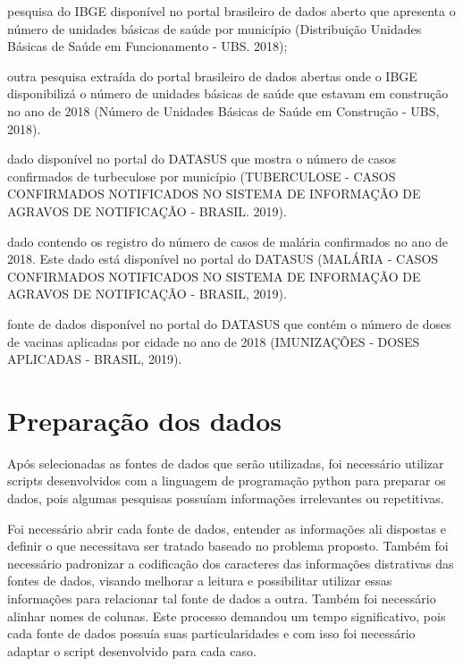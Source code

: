 \documentclass[
	12pt,				%
	openright,			%
	oneside,			%
	a4paper,			%
	chapter=TITLE,		%
	section=TITLE,		%
	subsection=TITLE,	%
	subsubsection=TITLE,%
	english,			%
	brazil				%
	]{abntex2}
\theoremstyle{definition}
\begin{document}
    \begin{description}[font=$\bullet$~\normalfont\scshape\color{black!50!black}]
    \item [UBS Existente] pesquisa do IBGE disponível no portal brasileiro de dados aberto que apresenta o número de unidades básicas de saúde por município (Distribuição Unidades Básicas de Saúde em Funcionamento - UBS. 2018);
    \item [UBS Construção] outra pesquisa extraída do portal brasileiro de dados abertas onde o IBGE disponibilizá o número de unidades básicas de saúde que estavam em construção no ano de 2018 (Número de Unidades Básicas de Saúde em Construção - UBS, 2018). 
    \item [Casos Turbeculose] dado disponível no portal do DATASUS que mostra o número de casos confirmados de turbeculose por município (TUBERCULOSE - CASOS CONFIRMADOS NOTIFICADOS NO SISTEMA DE INFORMAÇÃO DE AGRAVOS DE NOTIFICAÇÃO - BRASIL. 2019).
    \item [Casos Malária] dado contendo os registro do número de casos de malária confirmados no ano de 2018. Este dado está disponível no portal do DATASUS (MALÁRIA - CASOS CONFIRMADOS NOTIFICADOS NO SISTEMA DE INFORMAÇÃO DE AGRAVOS DE NOTIFICAÇÃO - BRASIL, 2019).
    \item [Imunizações - Doses Aplicadas] fonte de dados disponível no portal do DATASUS que contém o número de doses de vacinas aplicadas por cidade no ano de 2018 (IMUNIZAÇÕES - DOSES APLICADAS - BRASIL, 2019).
    \end{description}
    
    
\section{Preparação dos dados}
    
    Após selecionadas as fontes de dados que serão utilizadas, foi necessário utilizar scripts desenvolvidos com a linguagem de programação python para preparar os dados, pois algumas pesquisas possuíam informações irrelevantes ou repetitivas.
    
    Foi necessário abrir cada fonte de dados, entender as informações ali dispostas e definir o que necessitava ser tratado baseado no problema proposto.
    Também foi necessário padronizar a codificação dos caracteres das informações distrativas das fontes de dados, visando melhorar a leitura e possibilitar utilizar essas informações para relacionar tal fonte de dados a outra. Também foi necessário alinhar nomes de colunas. Este processo demandou um tempo significativo, pois cada fonte de dados possuía suas particularidades e com isso foi necessário adaptar o script desenvolvido para cada caso.
    
\end{document}
